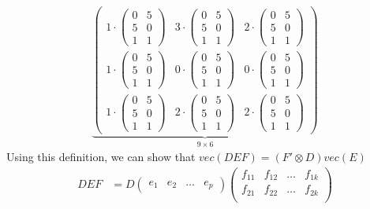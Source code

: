 \begin{enumerate}
\begin{align*}
\underbrace{\begin{pmatrix} 1\cdot\begin{pmatrix}0&5\\5&0\\1&1 \end{pmatrix}&3\cdot\begin{pmatrix}0&5\\5&0\\1&1 \end{pmatrix}&2\cdot\begin{pmatrix}0&5\\5&0\\1&1 \end{pmatrix}\\1\cdot\begin{pmatrix}0&5\\5&0\\1&1 \end{pmatrix}&0\cdot\begin{pmatrix}0&5\\5&0\\1&1 \end{pmatrix}&0\cdot\begin{pmatrix}0&5\\5&0\\1&1 \end{pmatrix}\\1\cdot\begin{pmatrix}0&5\\5&0\\1&1 \end{pmatrix}&2\cdot\begin{pmatrix}0&5\\5&0\\1&1 \end{pmatrix}&2\cdot\begin{pmatrix}0&5\\5&0\\1&1 \end{pmatrix}  \end{pmatrix}}_{9\times6}
\end{align*}
Using this definition, we can show that $vec(DEF) = (F' \otimes D) vec(E)$
\begin{align*}
DEF &= D \begin{pmatrix} e_1 & e_2 & \dots & e_p \end{pmatrix}
	\begin{pmatrix}
	f_{11} &f_{12} &\dots &f_{1k} \\
	f_{21} &f_{22} &\dots &f_{2k} \\

\end{pmatrix}
\end{align*}
\end{enumerate}
